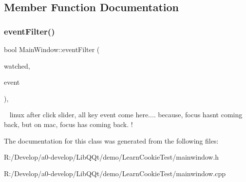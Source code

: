 \subsection{Member Function Documentation}
\mbox{\label{class_main_window_ade305265b2120df2489a5ebeb07ebbe1}} 
\subsubsection{\texorpdfstring{event\+Filter()}{eventFilter()}}
{\footnotesize\ttfamily bool Main\+Window\+::event\+Filter (\begin{DoxyParamCaption}\item[{Q\+Object $\ast$}]{watched,  }\item[{Q\+Event $\ast$}]{event }\end{DoxyParamCaption})\hspace{0.3cm}{\ttfamily [override]}, {\ttfamily [virtual]}}

~\newline
 linux after click slider, all key event come here.... because, focus hasn\textquotesingle{}t coming back, but on mac, focus has coming back. ! 

The documentation for this class was generated from the following files\+:\begin{DoxyCompactItemize}
\item 
R\+:/\+Develop/a0-\/develop/\+Lib\+Q\+Qt/demo/\+Learn\+Cookie\+Test/mainwindow.\+h\item 
R\+:/\+Develop/a0-\/develop/\+Lib\+Q\+Qt/demo/\+Learn\+Cookie\+Test/mainwindow.\+cpp\end{DoxyCompactItemize}
